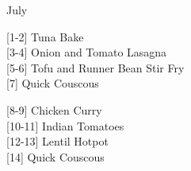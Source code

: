 		\begin{menu}{July}
    
    \begin{recipelist}
    
        {\scriptsize[1-2]} Tuna Bake\\
        {\scriptsize[3-4]} Onion and Tomato Lasagna\\
        {\scriptsize[5-6]} Tofu and Runner Bean Stir Fry\\
        {\scriptsize[7]} Quick Couscous\\%
    \end{recipelist}%
    \begin{recipelist}
    
        {\scriptsize[8-9]} Chicken Curry\\
        {\scriptsize[10-11]} Indian Tomatoes\\
        {\scriptsize[12-13]} Lentil Hotpot\\
        {\scriptsize[14]} Quick Couscous\\%
    \end{recipelist}\par%
  

\end{menu}

